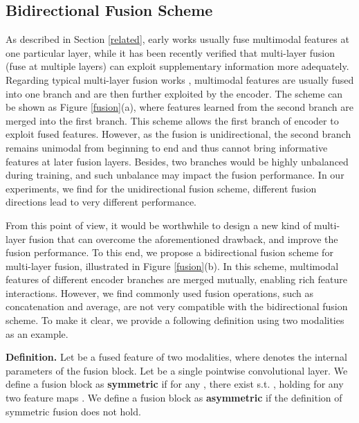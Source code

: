 \documentclass[sigconf]{acmart}
\begin{document}
\subsection{Bidirectional Fusion Scheme}
\label{sec:shuffleshift}
As described in Section \ref{related}, early works usually fuse multimodal features at one particular layer, while it has been recently verified that multi-layer fusion (fuse at multiple layers) can exploit supplementary information more adequately. Regarding typical multi-layer fusion works \cite{DBLP:conf/accv/HazirbasMDC16,DBLP:conf/cvpr/ZengTHYSCW19}, multimodal features are usually fused into one branch and are then further exploited by the encoder. The scheme can be shown as Figure \ref{fusion}(a), where features learned from the second branch are merged into the first branch. This scheme allows the first branch of encoder to exploit fused features. However, as the fusion is unidirectional, the second branch remains unimodal from beginning to end and thus cannot bring informative features at later fusion layers. Besides, two branches would be highly unbalanced during training, and such unbalance may impact the fusion performance. In our experiments, we find for the unidirectional fusion scheme, different fusion directions lead to very different performance. 




From this point of view, it would be worthwhile to design a new kind of multi-layer fusion that can overcome the aforementioned drawback, and improve the fusion performance. To this end, we propose a bidirectional fusion scheme for multi-layer  fusion, illustrated in Figure \ref{fusion}(b). In this scheme, multimodal features of different encoder branches are merged mutually, enabling rich feature interactions. However, we find commonly used fusion operations, such as concatenation and average, are not very compatible with the bidirectional fusion scheme. To make it clear, we provide a following definition using two modalities as an example.


\textbf{Definition.} Let  be a fused feature of two modalities, where  denotes the internal parameters of the fusion block. Let  be a single pointwise convolutional layer. We define a fusion block as \textbf{symmetric} if for any , there exist  s.t. , holding for any two feature maps . We define a fusion block as \textbf{asymmetric} if the definition of symmetric fusion does not hold.
\end{document}
